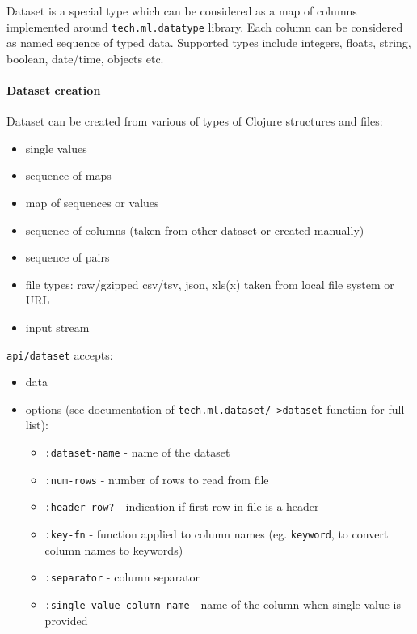 \documentclass[]{article}
\providecommand{\tightlist}{%
  \setlength{\itemsep}{0pt}\setlength{\parskip}{0pt}}
\let\oldparagraph\paragraph
\renewcommand{\paragraph}[1]{\oldparagraph{#1}\mbox{}}
\begin{document}
Dataset is a special type which can be considered as a map of columns
implemented around \texttt{tech.ml.datatype} library. Each column can be
considered as named sequence of typed data. Supported types include
integers, floats, string, boolean, date/time, objects etc.

\paragraph{Dataset creation}\label{dataset-creation}

Dataset can be created from various of types of Clojure structures and
files:

\begin{itemize}
\tightlist
\item
  single values
\item
  sequence of maps
\item
  map of sequences or values
\item
  sequence of columns (taken from other dataset or created manually)
\item
  sequence of pairs
\item
  file types: raw/gzipped csv/tsv, json, xls(x) taken from local file
  system or URL
\item
  input stream
\end{itemize}

\texttt{api/dataset} accepts:

\begin{itemize}
\tightlist
\item
  data
\item
  options (see documentation of
  \texttt{tech.ml.dataset/-\textgreater{}dataset} function for full
  list):

  \begin{itemize}
  \tightlist
  \item
    \texttt{:dataset-name} - name of the dataset
  \item
    \texttt{:num-rows} - number of rows to read from file
  \item
    \texttt{:header-row?} - indication if first row in file is a header
  \item
    \texttt{:key-fn} - function applied to column names (eg.
    \texttt{keyword}, to convert column names to keywords)
  \item
    \texttt{:separator} - column separator
  \item
    \texttt{:single-value-column-name} - name of the column when single
    value is provided
  \end{itemize}
\end{itemize}
\end{document}
